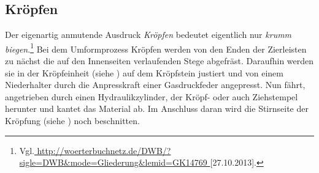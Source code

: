 \documentclass[12pt,a4paper,parskip,twoside,BCOR5mm,headsepline]{scrartcl}
\begin{document}
\begin{description*}
\section{Kröpfen \label{sec:kropf}}

Der eigenartig anmutende Ausdruck \emph{Kröpfen} bedeutet eigentlich nur \emph{krumm biegen}.\footnote{Vgl.\url{
http://woerterbuchnetz.de/DWB/?sigle=DWB&mode=Gliederung&lemid=GK14769
}[27.10.2013].}
Bei dem Umformprozess Kröpfen werden von den  Enden der Zierleisten zu nächst die auf den Innenseiten verlaufenden Stege  abgefräst.  Daraufhin werden sie in der Kröpfeinheit (siehe ) auf dem Kröpfstein justiert und von einem Niederhalter durch die Anpresskraft einer Gasdruckfeder angepresst. Nun fährt, angetrieben durch einen Hydraulikzylinder, der Kröpf- oder auch Ziehstempel herunter und kantet das Material ab. Im Anschluss daran wird die Stirnseite der Kröpfung (siehe ) noch beschnitten.
\begin{figure}[hbtp]
\centering
\hfill
{}

\end{figure}
\end{description*}
\end{document}
